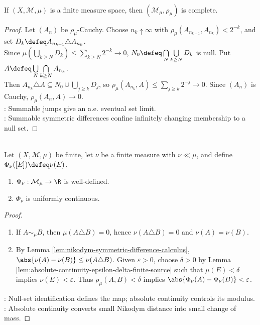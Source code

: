 \begin{theorem} \label{thm:nikodym-metric-complete} \\
If $(X,\mathcal{M},\mu)$ is a finite measure space, then $(\mathcal{M}_\mu,\rho_\mu)$ is complete.
\begin{proof} Let $(A_n)$ be $\rho_\mu$-Cauchy. Choose $n_k\uparrow\infty$ with $\rho_\mu(A_{n_{k+1}},A_{n_k})<2^{-k}$, and set $D_k\defeq A_{n_{k+1}}\triangle A_{n_k}$.\\
Since $\mu(\bigcup\limits_{k\geq N}D_k)\leq\sum\limits_{k\geq N}2^{-k}\to0$, $N_0\defeq\bigcap\limits_N\bigcup\limits_{k\geq N}D_k$ is null. Put $A\defeq\bigcup\limits_N\bigcap\limits_{k\geq N}A_{n_k}$.\\
Then $A_{n_k}\triangle A\subseteq N_0\cup\bigcup\limits_{j\geq k}D_j$, so $\rho_\mu(A_{n_k},A)\leq\sum\limits_{j\geq k}2^{-j}\to0$. Since $(A_n)$ is Cauchy, $\rho_\mu(A_n,A)\to0$.\\
: Summable jumps give an a.e. eventual set limit.\\
: Summable symmetric differences confine infinitely changing membership to a null set.
\end{proof}
\end{theorem}

\begin{proposition} \label{prop:absolute-continuity-nikodym-uniform-continuity} \\
Let $(X,\mathcal{M},\mu)$ be finite, let $\nu$ be a finite measure with $\nu\ll\mu$, and define $\Phi_\nu([E])\defeq\nu(E)$.
\begin{enumerate}[label=(\roman*)]
\setlength{\itemsep}{0pt}
\item $\Phi_\nu:\mathcal{M}_\mu\to\R$ is well-defined.
\item $\Phi_\nu$ is uniformly continuous.
\end{enumerate}
\begin{proof}
\begin{enumerate}[label=(\roman*)]
\setlength{\itemsep}{0pt}
\item If $A\sim_\mu B$, then $\mu(A\triangle B)=0$, hence $\nu(A\triangle B)=0$ and $\nu(A)=\nu(B)$.
\item By Lemma \ref{lem:nikodym-symmetric-difference-calculus}, $\abs{\nu(A)-\nu(B)}\leq\nu(A\triangle B)$. Given $\varepsilon>0$, choose $\delta>0$ by Lemma \ref{lem:absolute-continuity-epsilon-delta-finite-source} such that $\mu(E)<\delta$ implies $\nu(E)<\varepsilon$. Thus $\rho_\mu(A,B)<\delta$ implies $\abs{\Phi_\nu(A)-\Phi_\nu(B)}<\varepsilon$.
\end{enumerate}
: Null-set identification defines the map; absolute continuity controls its modulus.\\
: Absolute continuity converts small Nikodym distance into small change of mass.
\end{proof}
\end{proposition}

